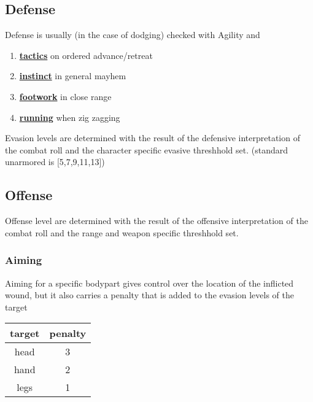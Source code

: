 \subsection{Defense}\label{subsec:defense}
Defense is usually (in the case of dodging) checked with Agility and
\begin{enumerate}[label = - ]
    \item \hyperref[subsec:tactics]{\textbf{tactics}} on ordered advance/retreat
    \item \hyperref[subsec:instinct]{\textbf{instinct}} in general mayhem
    \item \hyperref[subsec:footwork]{\textbf{footwork}} in close range
    \item \hyperref[subsec:running]{\textbf{running}} when zig zagging
\end{enumerate}
Evasion levels are determined with the result of the defensive interpretation of the combat roll
and the character specific evasive threshhold set. (standard unarmored is [5,7,9,11,13])

\subsection{Offense}\label{subsec:offense}
Offense level are determined with the result of the offensive \-interpretation of the combat roll \-and the range and
weapon \-specific threshhold set.\par
\subsubsection{Aiming}\label{subsubsec:aiming}
Aiming for a specific bodypart gives control over the location of the inflicted wound, but it also carries a penalty
that is added to the evasion levels of the target

\begin{tabular}{cc}
    target & penalty\\\hline
    head & 3 \\
    hand & 2 \\
    legs & 1
\end{tabular}

